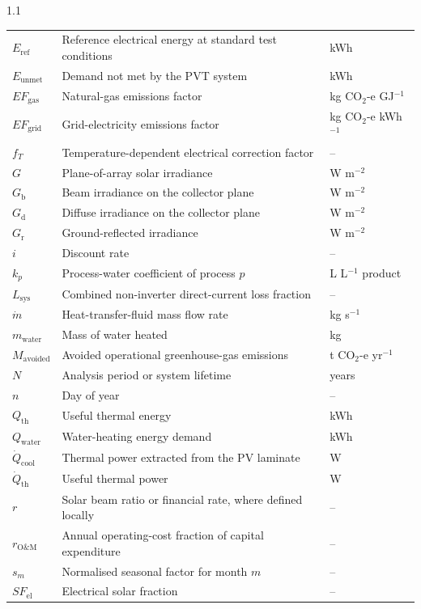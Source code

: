 \documentclass[12pt,letterpaper]{article}
\begin{document}
\begin{spacing}{1.1}
\begin{longtable}{@{}p{2.0cm} p{9.6cm} p{2.3cm}@{}}
$E_{\mathrm{ref}}$ & Reference electrical energy at standard test conditions & kWh \\
$E_{\mathrm{unmet}}$ & Demand not met by the PVT system & kWh \\
$EF_{\mathrm{gas}}$ & Natural-gas emissions factor & kg CO$_2$-e GJ$^{-1}$ \\
$EF_{\mathrm{grid}}$ & Grid-electricity emissions factor & kg CO$_2$-e kWh$^{-1}$ \\
$f_T$ & Temperature-dependent electrical correction factor & -- \\
$G$ & Plane-of-array solar irradiance & W m$^{-2}$ \\
$G_{\mathrm{b}}$ & Beam irradiance on the collector plane & W m$^{-2}$ \\
$G_{\mathrm{d}}$ & Diffuse irradiance on the collector plane & W m$^{-2}$ \\
$G_{\mathrm{r}}$ & Ground-reflected irradiance & W m$^{-2}$ \\
$i$ & Discount rate & -- \\
$k_p$ & Process-water coefficient of process $p$ & L L$^{-1}$ product \\
$L_{\mathrm{sys}}$ & Combined non-inverter direct-current loss fraction & -- \\
$\dot{m}$ & Heat-transfer-fluid mass flow rate & kg s$^{-1}$ \\
$m_{\mathrm{water}}$ & Mass of water heated & kg \\
$M_{\mathrm{avoided}}$ & Avoided operational greenhouse-gas emissions & t CO$_2$-e yr$^{-1}$ \\
$N$ & Analysis period or system lifetime & years \\
$n$ & Day of year & -- \\
$Q_{\mathrm{th}}$ & Useful thermal energy & kWh \\
$Q_{\mathrm{water}}$ & Water-heating energy demand & kWh \\
$\dot{Q}_{\mathrm{cool}}$ & Thermal power extracted from the PV laminate & W \\
$\dot{Q}_{\mathrm{th}}$ & Useful thermal power & W \\
$r$ & Solar beam ratio or financial rate, where defined locally & -- \\
$r_{\mathrm{O\&M}}$ & Annual operating-cost fraction of capital expenditure & -- \\
$s_m$ & Normalised seasonal factor for month $m$ & -- \\
$SF_{\mathrm{el}}$ & Electrical solar fraction & -- \\

\end{longtable}
\end{spacing}
\end{document}
